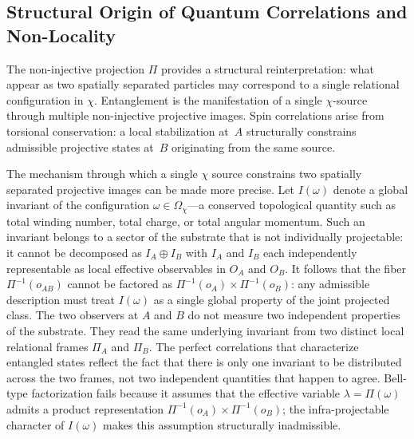 \subsection{Structural Origin of Quantum Correlations and Non-Locality}
  \label{app:structural-origin-quantum-correlations}

  The non-injective projection $\Pi$ provides a structural
  reinterpretation: what appear as two spatially separated particles may
  correspond to a single relational configuration in $\chi$.
  Entanglement is the manifestation of a single $\chi$-source through
  multiple non-injective projective images.
  Spin correlations arise from torsional conservation: a local
  stabilization at~$A$ structurally constrains admissible projective
  states at~$B$ originating from the same source.

  The mechanism through which a single $\chi$ source constrains two spatially separated
  projective images can be made more precise.
  Let $I(\omega)$ denote a global invariant of the configuration $\omega \in \Omega_\chi$---a
  conserved topological quantity such as total winding number, total charge, or total angular
  momentum.
  Such an invariant belongs to a sector of the substrate that is not individually projectable:
  it cannot be decomposed as $I_A \oplus I_B$ with $I_A$ and $I_B$ each independently
  representable as local effective observables in $O_A$ and $O_B$.
  It follows that the fiber $\Pi^{-1}(o_{AB})$ cannot be factored as
  $\Pi^{-1}(o_A) \times \Pi^{-1}(o_B)$: any admissible description must treat
  $I(\omega)$ as a single global property of the joint projected class.
  The two observers at $A$ and $B$ do not measure two independent properties of the substrate.
  They read the same underlying invariant from two distinct local relational frames
  $\Pi_A$ and $\Pi_B$.
  The perfect correlations that characterize entangled states reflect the fact that there is only
  one invariant to be distributed across the two frames, not two independent quantities
  that happen to agree.
  Bell-type factorization fails because it assumes that the effective variable
  $\lambda = \Pi(\omega)$ admits a product representation
  $\Pi^{-1}(o_A) \times \Pi^{-1}(o_B)$; the infra-projectable
  character of $I(\omega)$ makes this assumption structurally inadmissible.

